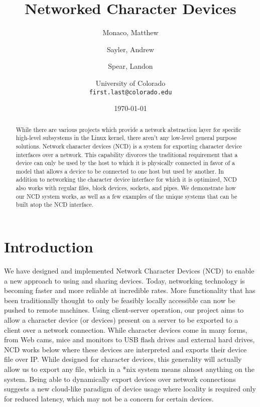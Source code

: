 \documentclass[11pt,twocolumn]{article}
\begin{document}
\title{Networked Character Devices}
\author{Monaco, Matthew \and Sayler, Andrew \and Spear, Landon \\
  \and University of Colorado \\
  \texttt{first.last@colorado.edu}
}
\date{\today}

\maketitle

\begin{abstract}
While there are various projects which provide a network abstraction layer for
specific high-level subsystems in the Linux kernel, there aren't any low-level
general purpose solutions. Network character devices (NCD) is a system for
exporting character device interfaces over a network. This capability
divorces the traditional requirement that a device can only be used by
the host to which it is physically connected in favor of a model that
allows a device to be connected to one host but used by another.
In addition to networking the character device interface for which it
is optimized, NCD also works with regular files, block devices,
sockets, and pipes. We demonstrate how our NCD system works, as well
as a few examples of the unique systems that can be built atop the NCD
interface.
\end{abstract}


\section{Introduction}
\label{sec:introduction}

We have designed and implemented Network Character Devices (NCD) to
enable a new approach to using and sharing devices. Today, networking 
technology is becoming faster and more reliable at incredible rates. 
More functionality that has been traditionally thought to only be 
feasibly locally accessible can now be pushed to remote
machines. Using client-server operation, our project aims to allow 
a character device (or devices) present on a server to be exported to
a client over a network connection. While character devices come in 
many forms, from Web cams, mice and monitors to USB flash drives and 
external hard drives, NCD works below where these devices are 
interpreted and exports their device file over IP. While designed for
character devices, this generality will actually allow us to export 
any file, which in a *nix system means almost anything on the
system. Being able to dynamically export devices over network
connections suggests a new cloud-like paradigm of device usage where 
locality is required only for reduced latency, which may not be a
concern for certain devices. 
\end{document}
